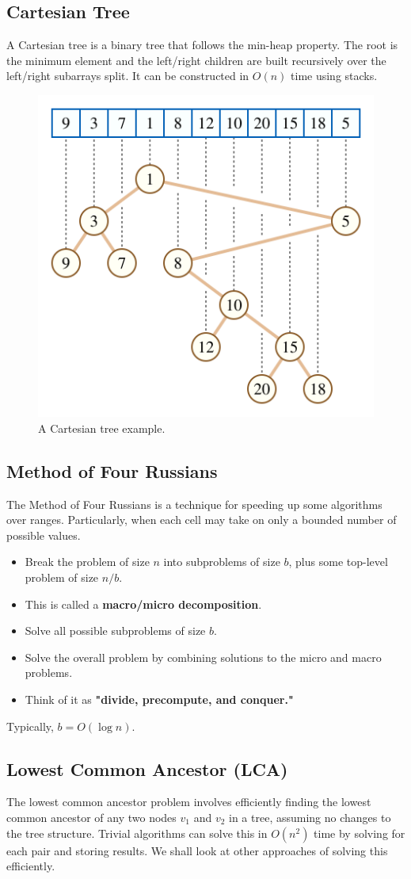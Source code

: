 \documentclass[12pt]{article}
\begin{document}
\subsection{Cartesian Tree\cite{cartesian_tree}}
A Cartesian tree is a binary tree that follows the min-heap property. The root is the minimum element and the left/right children are built recursively over the left/right subarrays split.  
It can be constructed in $O(n)$ time using stacks.  

\begin{figure}[H]
  \centering
  \includegraphics[width=0.4\linewidth]{cartesian_tree.png}
  \caption{A Cartesian tree example.\cite{cartesian_tree}}\label{fig:cartesian}
\end{figure}

\subsection{Method of Four Russians\cite{method_of_four_russians}}
The Method of Four Russians is a technique for speeding up some algorithms over ranges. Particularly, when each cell may take on only a bounded number of possible values.  
\begin{itemize}
  \item Break the problem of size $n$ into subproblems of size $b$, plus some top-level problem of size $n / b$.
  \item This is called a \textbf{macro/micro decomposition}.
  \item Solve all possible subproblems of size $b$.
  \item Solve the overall problem by combining solutions to the micro and macro problems.
  \item Think of it as \textbf{"divide, precompute, and conquer."\cite{cs166_1}}  
\end{itemize}
Typically, $b = O(\log n)$. 

\subsection{Lowest Common Ancestor (LCA)}
The lowest common ancestor problem involves efficiently finding the lowest common ancestor of any two nodes $v_1$ and $v_2$ in a tree, assuming no changes to the tree structure.  
Trivial algorithms can solve this in $O(n^2)$ time by solving for each pair and storing results.  
We shall look at other approaches of solving this efficiently.  
\end{document}
